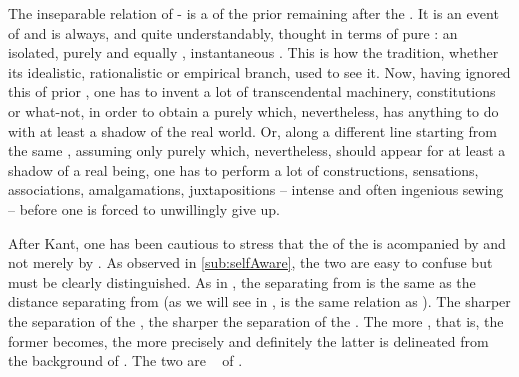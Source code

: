 The inseparable relation of - is a  of the
prior  remaining after the . It is an event of
 and is always, and quite understandably, thought in terms of
pure : an isolated, purely   and equally
, instantaneous .  This is how the tradition, whether its
idealistic, rationalistic or empirical branch, used to see it.  Now, having
ignored this  of prior , one has to invent a lot of
transcendental machinery, constitutions or what-not, in order to obtain a purely
  which, nevertheless, has anything to do with at least a
shadow of the real world.  Or, along a different line starting from the same
, assuming only purely   which,
nevertheless, should appear for at least a shadow of a real being, one has to
perform a lot of constructions, sensations, associations, amalgamations,
juxtapositions -- intense and often ingenious sewing -- before one is forced to
unwillingly give up.

\pa\label{pa:KnasterTarski} After Kant, one has been cautious to stress that the
 of the  is acompanied by  and not
merely by . As observed in \ref{sub:selfAware}, the two are
easy to confuse but must be clearly distinguished.  As in ,
the  separating  from  is the same as the
distance separating  from  (as we will see in
,  is the same relation as
). The sharper the separation of the , the sharper the
separation of the . The more , that is,
 the former becomes, the more precisely and definitely the latter
is delineated from the background of .  The two are \equi\ 
 of .

